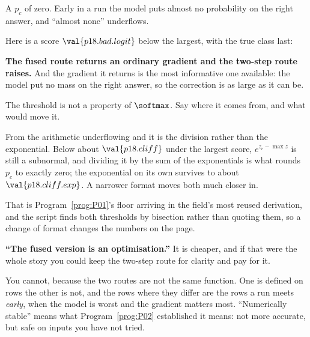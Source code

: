 \begin{fr}
\begin{ansblock}
A $p_c$ of zero. Early in a run the model puts almost no probability on the
right answer, and \enquote{almost none} underflows.
\end{ansblock}

Here is a score $\val{p18.bad.logit}$ below the largest, with the true class
last:


\textbf{The fused route returns an ordinary gradient and the two-step route
raises.} And the gradient it returns is the most informative one available:
the model put no mass on the right answer, so the correction is as large as
it can be.
\end{fr}

\begin{fr}
The threshold is not a property of $\softmax$. Say where it comes from, and
what would move it.
\nextframe
\end{fr}

\begin{fr}
\begin{ansblock}
From the arithmetic underflowing \dash{} and it is the division rather than
the exponential. Below about $\val{p18.cliff}$ under the largest score,
$e^{z_c - \max z}$ is still a subnormal, and dividing it by the sum of the
exponentials is what rounds $p_c$ to exactly zero; the exponential on its own
survives to about $\val{p18.cliff.exp}$. A narrower format moves both much
closer in.
\end{ansblock}

That is Program~\ref{prog:P01}'s floor arriving in the field's most reused
derivation, and the script finds both thresholds by bisection rather than
quoting them, so a change of format changes the numbers on the page.

\begin{trapbox}
\textbf{\enquote{The fused version is an optimisation.}} It is cheaper, and
if that were the whole story you could keep the two-step route for clarity
and pay for it.

You cannot, because the two routes are not the same function. One is defined
on rows the other is not, and the rows where they differ are the rows a run
meets \emph{early}, when the model is worst and the gradient matters most.
\enquote{Numerically stable} means what Program~\ref{prog:P02} established it
means: not more accurate, but safe on inputs you have not tried.
\end{trapbox}
\end{fr}

